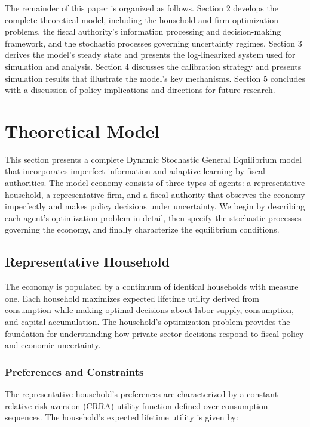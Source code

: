 \documentclass[5p,authoryear]{elsarticle}
\begin{document}
The remainder of this paper is organized as follows. Section 2 develops the complete theoretical model, including the household and firm optimization problems, the fiscal authority's information processing and decision-making framework, and the stochastic processes governing uncertainty regimes. Section 3 derives the model's steady state and presents the log-linearized system used for simulation and analysis. Section 4 discusses the calibration strategy and presents simulation results that illustrate the model's key mechanisms. Section 5 concludes with a discussion of policy implications and directions for future research.

\section{Theoretical Model}

This section presents a complete Dynamic Stochastic General Equilibrium model that incorporates imperfect information and adaptive learning by fiscal authorities. The model economy consists of three types of agents: a representative household, a representative firm, and a fiscal authority that observes the economy imperfectly and makes policy decisions under uncertainty. We begin by describing each agent's optimization problem in detail, then specify the stochastic processes governing the economy, and finally characterize the equilibrium conditions.

\subsection{Representative Household}

The economy is populated by a continuum of identical households with measure one. Each household maximizes expected lifetime utility derived from consumption while making optimal decisions about labor supply, consumption, and capital accumulation. The household's optimization problem provides the foundation for understanding how private sector decisions respond to fiscal policy and economic uncertainty.

\subsubsection{Preferences and Constraints}

The representative household's preferences are characterized by a constant relative risk aversion (CRRA) utility function defined over consumption sequences. The household's expected lifetime utility is given by:
\end{document}
